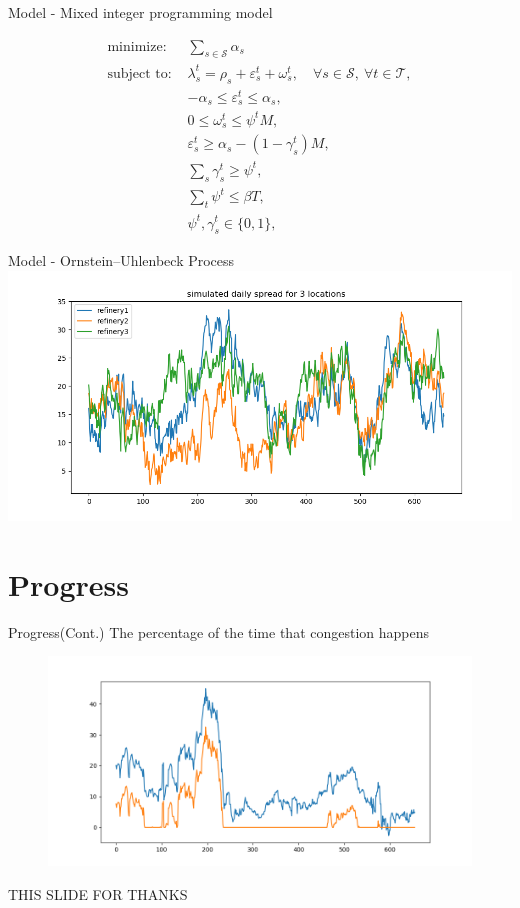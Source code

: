 \documentclass[aspectratio = 169]{beamer}
\renewcommand{\S}{\mathcal{S}}
\newcommand{\T}{\mathcal{T}}
\begin{document}
\begin{frame}{Model - Mixed integer programming model}
\begin{figure}
\begin{equation*}
\begin{split}
\text{minimize: } &\sum_{s\in\S} \alpha_s\\
\text{subject to: } &\lambda_s^t = \rho_s + \varepsilon_s^t +\omega_s^t, \quad \forall s\in\S,~\forall t\in\T,\\
&-\alpha_s\leq\varepsilon_s^t \leq \alpha_s,\\
&0\leq\omega_s^t\leq \psi^t M,\\
&\varepsilon_s^t \geq \alpha_s - (1-\gamma_s^t) M,\\
&\sum_s \gamma_s^t\geq \psi^t,\\
&\sum_t \psi^t \leq \beta T,\\
&\psi^t, \gamma_s^t \in\{0,1\},
\end{split}
\end{equation*}
\end{figure}
\end{frame} 





\begin{frame}{Model - Ornstein--Uhlenbeck Process}
\includegraphics[width=\linewidth]{simulated spread.png}
\end{frame}


\section{Progress}


\begin{frame}{Progress(Cont.)}
\Large{The percentage of the time that congestion happens}
 \begin{figure}
\includegraphics[scale=0.5]{OM-images/betha.png}
\end{figure}
\end{frame}

\begin{frame}{THIS SLIDE FOR THANKS}
    
\end{frame}
\end{document}
